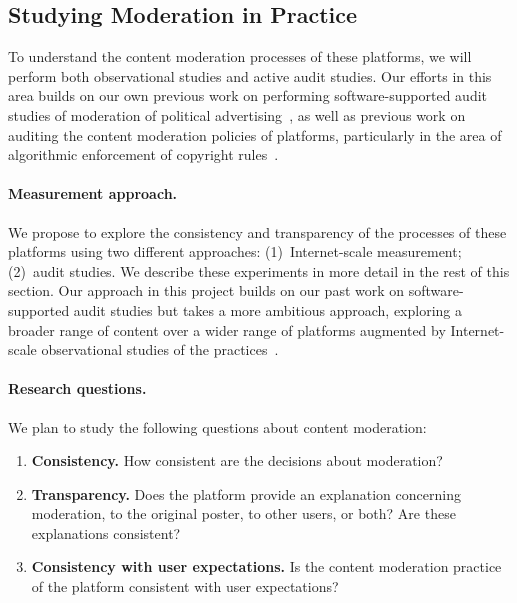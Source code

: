 \subsection{Studying Moderation in Practice}
\label{sec:auditing}

To understand the content moderation processes of these platforms, we will
perform both observational studies and active audit studies. Our efforts in
this area builds on our own previous work on performing software-supported
audit studies of moderation of political
advertising~\cite{hounsel2021software}, as well as previous work on auditing
the content moderation policies of platforms, particularly in the area of
algorithmic enforcement of copyright rules~\cite{perel2017black,
gray2020playing}.  

\paragraph{Measurement approach.} We propose to explore the consistency and
transparency of the processes of these platforms using two different
approaches: (1)~Internet-scale measurement; (2)~audit studies.  We describe
these experiments in more detail in the rest of this section.  Our approach in
this project builds on our past work on software-supported audit studies but
takes a more ambitious approach, exploring a broader range of content over a
wider range of platforms augmented by Internet-scale observational studies of the
practices~\cite{hounsel2021software}.  


\paragraph{Research questions.} We plan to study the following questions about
content moderation: 
\begin{enumerate}
    \item {\bf Consistency.} How consistent are the decisions about moderation?  
    \item {\bf Transparency.} Does the platform provide an explanation concerning moderation, to
        the original poster, to other users, or both? Are these explanations
        consistent?  
    \item {\bf Consistency with user expectations.} Is the content moderation
        practice of the platform consistent with user expectations?
\end{enumerate} 

